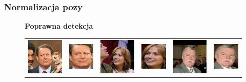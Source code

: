 \subsubsection{Normalizacja pozy}

\begin{figure}[H]
    \begin{center}
    \renewcommand\tabcolsep{1pt}
    {\bf Poprawna detekcja}
    \begin{tabular}{cc||cc||cc}
      \includegraphics[width=.15\linewidth]{img/crop_examples/before/good/Al_Gore_0007.jpg} &
      \includegraphics[width=.15\linewidth]{img/crop_examples/after/good/Al_Gore_0007.jpg} &
      \includegraphics[width=.15\linewidth]{img/crop_examples/before/good/Jennifer_Lopez_0021.jpg} &
      \includegraphics[width=.15\linewidth]{img/crop_examples/after/good/Jennifer_Lopez_0021.jpg} &
      \includegraphics[width=.15\linewidth]{img/crop_examples/before/good/Lech_Walesa_0002.jpg} &
      \includegraphics[width=.15\linewidth]{img/crop_examples/after/good/Lech_Walesa_0002.jpg} \\

\end{tabular}
\end{center}
\end{figure}
